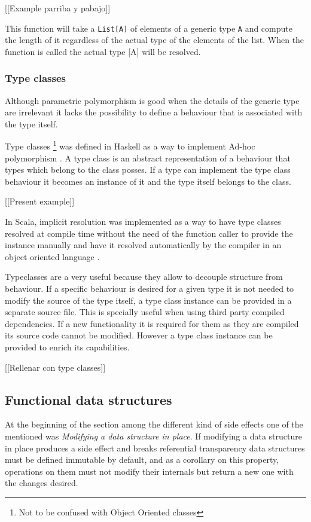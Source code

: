 \documentclass[../main.tex]{subfiles}
\begin{document}
[[Example parriba y pabajo]]

This function will take a \texttt{List[A]} of elements of a generic type \texttt{A} and compute the length of it regardless of the actual type of the elements of the list. When the function is called the actual type [A] will be resolved.

\subsubsection{Type classes}
Although parametric polymorphism is good when the details of the generic type are irrelevant it lacks the possibility to define a behaviour that is associated with the type itself. 

Type classes \footnote{Not to be confused with Object Oriented classes} was defined in Haskell as a way to implement Ad-hoc polymorphism \autocite{Hall1994TypeHaskell}. A type class is an abstract representation of a behaviour that types which belong to the class posses. If a type can implement the type class behaviour it becomes an instance of it and the type itself belongs to the class. 

[[Present example]]

In Scala, implicit resolution was implemented as a way to have type classes resolved at compile time without the need of the function caller to provide the instance manually and have it resolved automatically by the compiler in an object oriented language \autocite{Oliveira2010TypeImplicits}.

Typeclasses are a very useful because they allow to decouple structure from behaviour. If a specific behaviour is desired for a given type it is not needed to modify the source of the type itself, a type class instance can be provided in a separate source file. This is specially useful when using third party compiled dependencies. If a new functionality it is required for them as they are compiled its source code cannot be modified. However a type class instance can be provided to enrich its capabilities.

[[Rellenar con type classes]]

\subsection{Functional data structures}
At the beginning of the section among the different kind of side effects one of the mentioned was \textit{Modifying a data structure in place}. If modifying a data structure in place produces a side effect and breaks referential transparency data structures must be defined immutable by default, and as a corollary on this property, operations on them must not modify their internals but return a new one with the changes desired.
\end{document}
